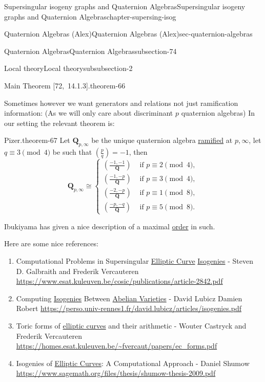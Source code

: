 \documentclass[oneside,10pt,]{book}
\numberwithin{equation}{section}
\newcommand{\legendre}[2]{\left(\frac{#1}{#2}\right)}
\newcommand{\QQ}{\mathbf{Q}}
\newcommand{\amp}{&}
\begin{document}
\begin{chapterptx}{Supersingular isogeny graphs and Quaternion Algebras}{}{Supersingular isogeny graphs and Quaternion Algebras}{}{}{chapter-supersing-isog}
\begin{sectionptx}{Quaternion Algebras (Alex)}{}{Quaternion Algebras (Alex)}{}{}{sec-quaternion-algebras}
\begin{subsectionptx}{Quaternion Algebras}{}{Quaternion Algebras}{}{}{subsection-74}
\begin{subsubsectionptx}{Local theory}{}{Local theory}{}{}{subsubsection-2}
\begin{theorem}{Main Theorem [72,~14.1.3].}{}{theorem-66}
%
\end{theorem}
\hypertarget{p-932}{}%
Sometimes however we want generators and relations not just ramification information: (As we will only care about discriminant \(p\) quaternion algebras) In our setting the relevant theorem is:%
\begin{theorem}{Pizer.}{}{theorem-67}%
\hypertarget{p-933}{}%
Let \(\QQ_{p,\infty}\) be the unique quaternion algebra \hyperref[def-dess-ramified]{ramified} at \(p,\infty\), let \(q \equiv 3 \pmod 4\) be such that \(\legendre pq = -1\), then%
\begin{equation*}
\QQ_{p,\infty} \cong
\begin{cases}
\legendre{-1,-1}{\QQ} \amp \text{ if }p\equiv 2\pmod 4,\\
\legendre{-1,-p}{\QQ} \amp \text{ if }p\equiv 3\pmod 4,\\
\legendre{-2,-p}{\QQ} \amp \text{ if }p\equiv 1\pmod 8,\\
\legendre{-p,-q}{\QQ} \amp \text{ if }p\equiv 5\pmod 8.
\end{cases}
\end{equation*}
%
\end{theorem}
\hypertarget{p-934}{}%
Ibukiyama has given a nice description of a maximal \hyperref[def-order-quaternion]{order} in such.%
\par
\hypertarget{p-935}{}%
Here are some nice references:\leavevmode%
\begin{enumerate}
\item\hypertarget{li-227}{}Computational Problems in Supersingular \hyperref[def-supersing-isog-ec]{Elliptic Curve} \hyperref[def-supersing-isog-isog]{Isogenies} - Steven D. Galbraith and Frederik Vercauteren \url{https://www.esat.kuleuven.be/cosic/publications/article-2842.pdf}%
\item\hypertarget{li-228}{}Computing \hyperref[def-supersing-isog-isog]{Isogenies} Between \hyperref[def-buntes-abvar]{Abelian Varieties} - David Lubicz Damien Robert \url{https://perso.univ-rennes1.fr/david.lubicz/articles/isogenies.pdf}%
\item\hypertarget{li-229}{}Toric forms of \hyperref[def-supersing-isog-ec]{elliptic curves} and their arithmetic - Wouter Castryck and Frederik Vercauteren \url{https://homes.esat.kuleuven.be/\~fvercaut/papers/ec_forms.pdf}%
\item\hypertarget{li-230}{}Isogenies of \hyperref[def-supersing-isog-ec]{Elliptic Curves}: A Computational Approach - Daniel Shumow \url{https://www.sagemath.org/files/thesis/shumow-thesis-2009.pdf}%

\end{enumerate}
\end{subsubsectionptx}
\end{subsectionptx}
\end{sectionptx}
\end{chapterptx}
\end{document}
